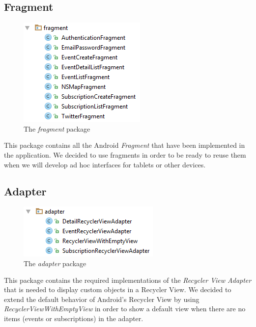 \documentclass[a4paper]{scrreprt}
\begin{document}
\subsection{Fragment}
\begin{figure}[H]
	\centering
	\includegraphics{imgs/pack_fragment}
	\caption{The \emph{fragment} package}
\end{figure}
This package contains all the Android \emph{Fragment} that have been implemented in the application. We decided to use fragments in order to be ready to reuse them when we will develop ad hoc interfaces for tablets or other devices.

\subsection{Adapter}
\begin{figure}[H]
	\centering
	\includegraphics{imgs/pack_adapter}
	\caption{The \emph{adapter} package}
\end{figure}
This package contains the required implementations of the \emph{Recycler View Adapter} that is needed to display custom objects in a Recycler View. We decided to extend the default behavior of Android's Recycler View by using \emph{RecyclerViewWithEmptyView} in order to show a default view when there are no items (events or subscriptions) in the adapter.
\end{document}
